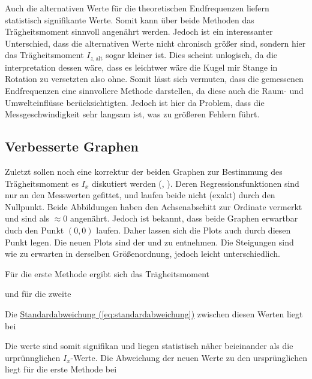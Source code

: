 Auch die alternativen Werte für die theoretischen Endfrequenzen liefern statistisch signifikante Werte. Somit kann über beide Methoden das Trägheitsmoment sinnvoll angenährt werden. Jedoch ist ein interessanter Unterschied, dass die alternativen Werte nicht chronisch größer sind, sondern hier das Trägheitsmoment $I_{z,\text{alt}}$ sogar kleiner ist. 
Dies scheint unlogisch, da die interpretation dessen wäre, dass es leichtwer wäre die Kugel mir Stange in Rotation zu versetzten also ohne. Somit lässt sich vermuten, dass die gemessenen Endfrequenzen eine sinnvollere Methode darstellen, da diese auch die Raum- und Umwelteinflüsse berücksichtigten. Jedoch ist hier da Problem, dass die Messgeschwindigkeit sehr langsam ist, was zu größeren Fehlern führt.

\subsection{Verbesserte Graphen}
Zuletzt sollen noch eine korrektur der beiden Graphen zur Bestimmung des Trägheitsmoment es $I_x$ diskutiert werden (, ). Deren Regressionsfunktionen sind nur an den Messwerten gefittet, und laufen beide nicht (exakt) durch den Nullpunkt. Beide Abbildungen haben den Achsenabschitt zur Ordinate vermerkt und sind als $\approx 0$ angenährt. 
Jedoch ist bekannt, dass beide Graphen erwartbar duch den Punkt $(0,0)$ laufen. Daher lassen sich die Plots auch durch diesen Punkt legen. Die neuen Plots sind der  und  zu entnehmen. Die Steigungen sind wie zu erwarten in derselben Größenordnung, jedoch leicht unterschiedlich. 

Für die erste Methode ergibt sich das Trägheitsmoment  

und für die zweite

Die \hyperref[eq:standardabweichung]{Standardabweichung (\ref*{eq:standardabweichung})} zwischen diesen Werten liegt bei


Die werte sind somit signifikan und liegen statistisch näher beieinander als die urprünnglichen $I_x$-Werte. Die Abweichung der neuen Werte zu den ursprünglichen liegt für die erste Methode bei



